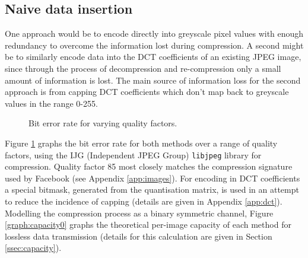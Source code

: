 \subsection{Naive data insertion}
\label{ssec:naive}

One approach would be to encode directly into greyscale pixel values with enough redundancy to overcome the information lost during compression. A second might be to similarly encode data into the DCT coefficients of an existing JPEG image, since through the process of decompression and re-compression only a small amount of information is lost. The main source of information loss for the second approach is from capping DCT coefficients which don't map back to greyscale values in the range 0-255.

\begin{figure}[tbp]
  \begin{center}
    \caption{Bit error rate for varying quality factors.}
    \label{graph:ber0}
  \end{center}
\end{figure}

Figure \ref{graph:ber0} graphs the bit error rate for both methods over a range of quality factors, using the IJG (Independent JPEG Group) {\tt libjpeg} library for compression. Quality factor 85 most closely matches the compression signature used by Facebook (see Appendix \ref{app:images}). For encoding in DCT coefficients a special bitmask, generated from the quantisation matrix, is used in an attempt to reduce the incidence of capping (details are given in Appendix \ref{app:dct}). Modelling the compression process as a binary symmetric channel, Figure \ref{graph:capacity0} graphs the theoretical per-image capacity of each method for lossless data transmission (details for this calculation are given in Section \ref{ssec:capacity}).


